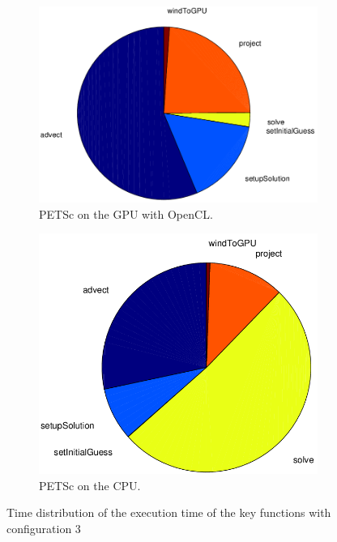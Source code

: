 \begin{figure}[ht]
	\center
	
	\begin{subfigure}{0.45\textwidth}
		\center
		\includegraphics[width=1.0\textwidth]{results/data/td_conf3_petsc_gpu}
		\caption{PETSc on the GPU with OpenCL.}
		\label{fig:td_conf3_petsc_gpu}
	\end{subfigure}
	\begin{subfigure}{0.45\textwidth}
		\center
		\includegraphics[width=1.0\textwidth]{results/data/td_conf3_petsc_cpu}
		\caption{PETSc on the CPU.}
		\label{fig:td_conf3_petsc_cpu}
	\end{subfigure}
	\caption{Time distribution of the execution time of the key functions
			with configuration 3}
	\label{fig:td_conf3}
	
\end{figure}

